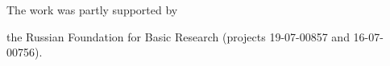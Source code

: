 









\Ack


\noindent


The work was partly supported by


the Russian Foundation for Basic Research (projects 19-07-00857 and 16-07-00756).


 








\renewcommand{\bibname}{\protect\rmfamily References}







